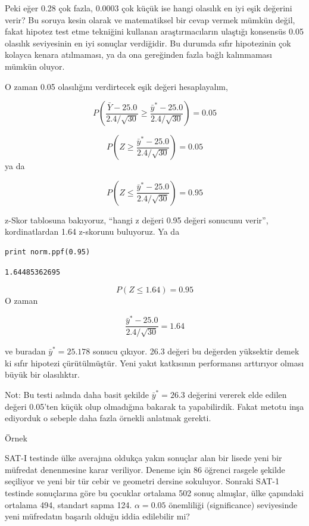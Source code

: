 \documentclass[12pt,fleqn]{article}\usepackage{../../common}
\begin{document}
Peki eğer 0.28 çok fazla, 0.0003 çok küçük ise hangi olasılık en iyi eşik
değerini verir? Bu soruya kesin olarak ve matematiksel bir cevap vermek
mümkün değil, fakat hipotez test etme tekniğini kullanan araştırmacıların
ulaştığı konsensüs 0.05 olasılık seviyesinin en iyi sonuçlar verdiğidir. Bu
durumda sıfır hipotezinin çok kolayca kenara atılmaması, ya da ona
gereğinden fazla bağlı kalınmaması mümkün oluyor.

O zaman 0.05 olasılığını verdirtecek eşik değeri hesaplayalım,

$$ P(\frac{\bar{Y} - 25.0}{2.4 / \sqrt{30}} \ge 
\frac{\bar{y}^\ast - 25.0}{2.4 / \sqrt{30}}) = 0.05
$$

$$ P(Z \ge  \frac{\bar{y}^\ast - 25.0}{2.4 / \sqrt{30}}) = 0.05
$$
ya da

$$ P(Z \le  \frac{\bar{y}^\ast - 25.0}{2.4 / \sqrt{30}}) = 0.95 $$

z-Skor tablosuna bakıyoruz, ``hangi z değeri 0.95 değeri sonucunu verir'',
kordinatlardan 1.64 z-skorunu buluyoruz. Ya da

\begin{verbatim}
print norm.ppf(0.95)
\end{verbatim}

\begin{verbatim}
1.64485362695
\end{verbatim}


$$ P(Z \le 1.64)  = 0.95 $$
O zaman 

$$ \frac{\bar{y}^\ast - 25.0}{2.4 / \sqrt{30}} = 1.64 $$

ve buradan $\bar{y}^\ast = 25.178$ sonucu çıkıyor. 26.3 değeri bu değerden
yüksektir demek ki sıfır hipotezi çürütülmüştür. Yeni yakıt katkısının
performansı arttırıyor olması büyük bir olasılıktır. 

Not: Bu testi aslında daha basit şekilde $\bar{y}^\ast = 26.3$ değerini
vererek elde edilen değeri 0.05'ten küçük olup olmadığına bakarak ta
yapabilirdik. Fakat metotu inşa ediyorduk o sebeple daha fazla örnekli
anlatmak gerekti. 

Örnek

SAT-I testinde ülke averajına oldukça yakın sonuçlar alan bir lisede yeni
bir müfredat denenmesine karar veriliyor. Deneme için 86 öğrenci rasgele
şekilde seçiliyor ve yeni bir tür cebir ve geometri dersine
sokuluyor. Sonraki SAT-1 testinde sonuçlarına göre bu çocuklar ortalama 502
sonuç almışlar, ülke çapındaki ortalama 494, standart sapma
124. $\alpha=0.05$ önemliliği (significance) seviyesinde yeni müfredatın
başarılı olduğu iddia edilebilir mi? 
\end{document}
